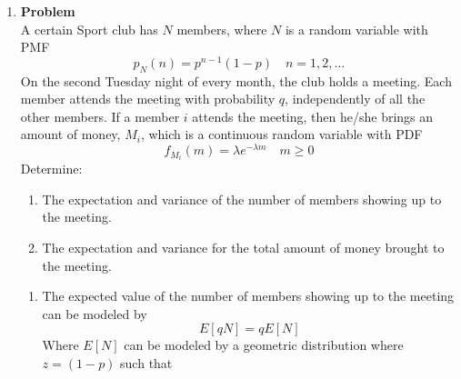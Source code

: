 \documentclass[12pt]{article}
\newenvironment{Ex}{\textbf{Problem}\vspace{.75em}\\}{}
\begin{document}
\begin{enumerate}
\begin{Ex}
\begin{solution}
\begin{tabularx}{.95\textwidth}{XX}
\begin{equation}
\begin{aligned}
            \text{Var}(H|D) &= \text{Var}(H) \\
            &= 0.25(E[D^2] - E[D]^2) \\
            &= 0.25(91/6 - 3.5^2) \\
            \text{Var}(H) &= 0.7292 \\
          \end{aligned}
        \end{equation}
      \end{tabularx}
    \end{solution}
  \end{Ex}
  \pagebreak[3]
\item
  \begin{Ex}
    A certain Sport club has $N$ members, where $N$ is a random
    variable with PMF
    \begin{equation}
      \label{eq:4-question-0}
      p_N(n) = p^{n-1}(1-p) \quad n=1,2,\ldots
    \end{equation}
    On the second Tuesday night of every month, the club holds a
    meeting. Each member attends the meeting with probability $q$,
    independently of all the other members. If a member $i$ attends
    the meeting, then he/she brings an amount of money, $M_i$, which is a
    continuous random variable with PDF
    \begin{equation}
      \label{eq:4-question-1}
      f_{M_{i}}(m) = \lambda e^{-\lambda m}\quad m\ge0
    \end{equation}
    Determine:
    \begin{enumerate}
    \item The expectation and variance of the number of members
      showing up to the meeting.
    \item The expectation and variance for the total amount of money
      brought to the meeting.
    \end{enumerate}
    \begin{solution} \hfill
      \begin{enumerate}
      \item The expected value of the number of members showing up to
        the meeting can be modeled by
        \begin{equation}
          \label{eq:4a-expectation-p}
          E[qN] = q E[N]
        \end{equation}
        Where $E[N]$ can be modeled by a geometric distribution where
        $z=(1-p)$ such that
        \begin{equation}

\end{equation}
\end{enumerate}
\end{solution}
\end{Ex}
\end{enumerate}
\end{document}
